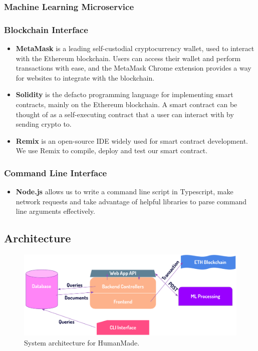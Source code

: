 \documentclass[12pt,a4paper]{article}
\begin{document}
\subsubsection{Machine Learning Microservice}



\subsubsection{Blockchain Interface}
\begin{itemize}
    \item \textbf{MetaMask} is a leading self-custodial cryptocurrency wallet, used to interact with the Ethereum blockchain. Users can access their wallet and perform transactions with ease, and the MetaMask Chrome extension provides a way for websites to integrate with the blockchain.
    \item \textbf{Solidity} is the defacto programming language for implementing smart contracts, mainly on the Ethereum blockchain. A smart contract can be thought of as a self-executing contract that a user can interact with by sending crypto to.
    \item \textbf{Remix} is an open-source IDE widely used for smart contract development. We use Remix to compile, deploy and test our smart contract. 
\end{itemize}
\subsubsection{Command Line Interface}
\begin{itemize}
    \item \textbf{Node.js} allows us to write a command line script in Typescript, make network requests and take advantage of helpful libraries to parse command line arguments effectively.
\end{itemize}

\subsection{Architecture}
\begin{figure}[H]
    \centering
    \includegraphics[scale=0.6]{architecture.png}
    \caption{System architecture for HumanMade. \cite{gpt4}}
\end{figure}
\end{document}

